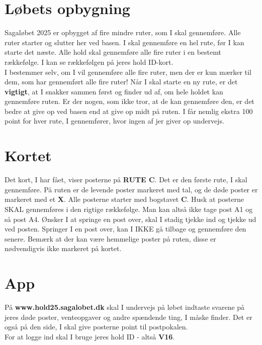 \section{Løbets opbygning}
Sagaløbet 2025 er opbygget af fire mindre ruter, som I skal gennemføre. Alle ruter starter og slutter her ved basen. I skal gennemføre en hel rute, før I kan starte det næste. Alle hold skal gennemføre alle fire ruter i en bestemt rækkefølge. I kan se rækkefølgen på jeres hold ID-kort.\\\newline
I bestemmer selv, om I vil gennemføre alle fire ruter, men der er kun mærker til dem, som har gennemført alle fire ruter! Når I skal starte en ny rute, er det \textbf{vigtigt}, at I snakker sammen først og finder ud af, om hele holdet kan gennemføre ruten. Er der nogen, som ikke tror, at de kan gennemføre den, er det bedre at give op ved basen end at give op midt på ruten. I får nemlig ekstra 100 point for hver rute, I gennemfører, hvor ingen af jer giver op undervejs.\\
\section{Kortet}
Det kort, I har fået, viser posterne på \textbf{RUTE C}. Det er den første rute, I skal gennemføre. På ruten er de levende poster markeret med tal, og de døde poster er markeret med et \textbf{X}. Alle posterne starter med bogstavet \textbf{C}. Husk at posterne SKAL gennemføres i den rigtige rækkefølge. Man kan altså ikke tage post A1 og så post A4. Ønsker I at springe en post over, skal I stadig tjekke ind og tjekke ud ved posten. Springer I en post over, kan I IKKE gå tilbage og gennemføre den senere. Bemærk at der kan være hemmelige poster på ruten, disse er nødvendigvis ikke markeret på kortet.
\section{App}
På \textbf{www.hold25.sagalobet.dk} skal I undervejs på løbet indtaste svarene på jeres døde poster, venteopgaver og andre spændende ting, I måske finder. Det er også på den side, I skal give posterne point til postpokalen.\\
For at logge ind skal I bruge jeres hold ID - altså \textbf{V16}.
\newpage
